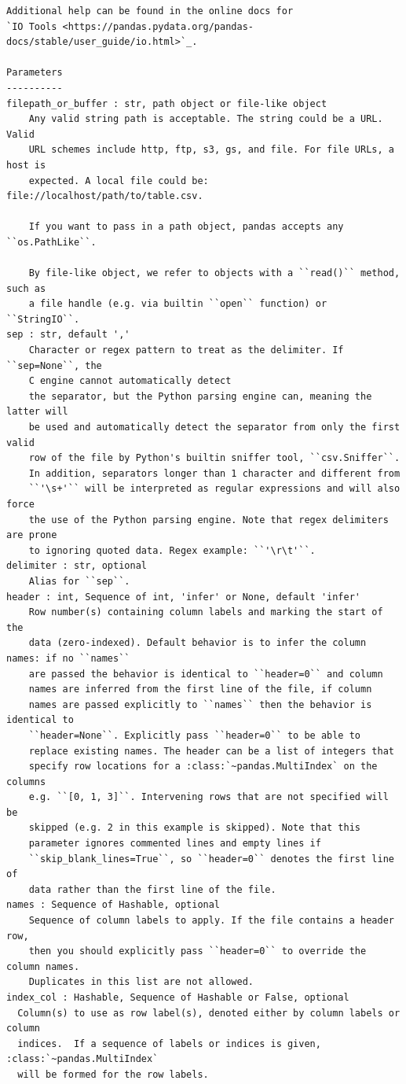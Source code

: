 \documentclass[
  letterpaper,
  DIV=11,
  numbers=noendperiod]{scrreprt}
\begin{document}
\begin{verbatim}
Additional help can be found in the online docs for
`IO Tools <https://pandas.pydata.org/pandas-docs/stable/user_guide/io.html>`_.

Parameters
----------
filepath_or_buffer : str, path object or file-like object
    Any valid string path is acceptable. The string could be a URL. Valid
    URL schemes include http, ftp, s3, gs, and file. For file URLs, a host is
    expected. A local file could be: file://localhost/path/to/table.csv.

    If you want to pass in a path object, pandas accepts any ``os.PathLike``.

    By file-like object, we refer to objects with a ``read()`` method, such as
    a file handle (e.g. via builtin ``open`` function) or ``StringIO``.
sep : str, default ','
    Character or regex pattern to treat as the delimiter. If ``sep=None``, the
    C engine cannot automatically detect
    the separator, but the Python parsing engine can, meaning the latter will
    be used and automatically detect the separator from only the first valid
    row of the file by Python's builtin sniffer tool, ``csv.Sniffer``.
    In addition, separators longer than 1 character and different from
    ``'\s+'`` will be interpreted as regular expressions and will also force
    the use of the Python parsing engine. Note that regex delimiters are prone
    to ignoring quoted data. Regex example: ``'\r\t'``.
delimiter : str, optional
    Alias for ``sep``.
header : int, Sequence of int, 'infer' or None, default 'infer'
    Row number(s) containing column labels and marking the start of the
    data (zero-indexed). Default behavior is to infer the column names: if no ``names``
    are passed the behavior is identical to ``header=0`` and column
    names are inferred from the first line of the file, if column
    names are passed explicitly to ``names`` then the behavior is identical to
    ``header=None``. Explicitly pass ``header=0`` to be able to
    replace existing names. The header can be a list of integers that
    specify row locations for a :class:`~pandas.MultiIndex` on the columns
    e.g. ``[0, 1, 3]``. Intervening rows that are not specified will be
    skipped (e.g. 2 in this example is skipped). Note that this
    parameter ignores commented lines and empty lines if
    ``skip_blank_lines=True``, so ``header=0`` denotes the first line of
    data rather than the first line of the file.
names : Sequence of Hashable, optional
    Sequence of column labels to apply. If the file contains a header row,
    then you should explicitly pass ``header=0`` to override the column names.
    Duplicates in this list are not allowed.
index_col : Hashable, Sequence of Hashable or False, optional
  Column(s) to use as row label(s), denoted either by column labels or column
  indices.  If a sequence of labels or indices is given, :class:`~pandas.MultiIndex`
  will be formed for the row labels.


\end{verbatim}
\end{document}
